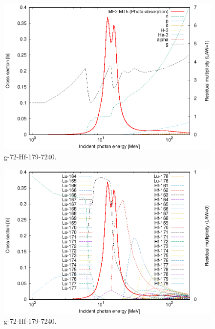 \begin{figure}
 \includegraphics[width=\linewidth]{eps/g_72-Hf-179_7240.eps}
  \caption{g-72-Hf-179-7240.}
\end{figure}
\begin{figure}
 \includegraphics[width=\linewidth]{eps-law0/g_72-Hf-179_7240.eps}
 \caption{g-72-Hf-179-7240.}
\end{figure}
\newpage \clearpage

